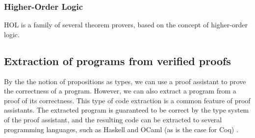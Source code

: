 \subsubsection{Higher-Order Logic}
\label{sssec:hol}

HOL is a family of several theorem provers, based on the concept of higher-order logic.

\subsection{Extraction of programs from verified proofs}
\label{ssec:extraction_of_programs_from_verified_proofs}

By the the notion of propositions as types, we can use a proof assistant to
prove the correctness of a program. However, we can also extract a program from
a proof of its correctness. This type of code extraction is a common feature of proof assistants.
The extracted program is guaranteed to be correct by the type system of the proof assistant,
and the resulting code can be extracted to several programming languages, such as Haskell and OCaml (as is the case for Coq) \cite{cintro}.

